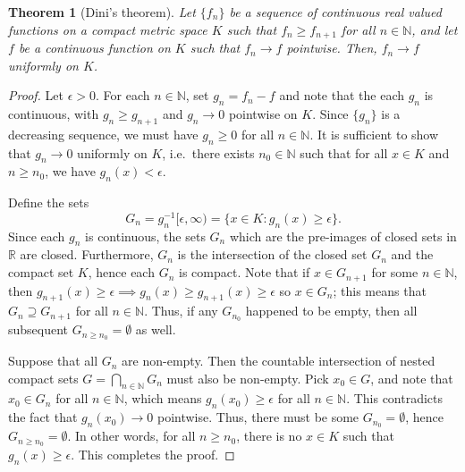 \documentclass[11pt]{article}
\def\R{\mathbb{R}}
\def\N{\mathbb{N}}
\newtheorem{theorem}{Theorem}[section]
\theoremstyle{definition}
\theoremstyle{remark}
\begin{document}
    \begin{theorem}[Dini's theorem] \label{theo:dini}
        Let $\{f_n\}$ be a sequence of continuous real valued functions on a compact
        metric space $K$ such that $f_n \geq f_{n + 1}$ for all $n \in \N$, and let
        $f$ be a continuous function on $K$ such that $f_n \to f$ pointwise. Then,
        $f_n \to f$ uniformly on $K$.
    \end{theorem}
    \begin{proof}
        Let $\epsilon > 0$. For each $n \in \N$, set $g_n = f_n - f$ and note that
        the each $g_n$ is continuous, with $g_n \geq g_{n + 1}$ and $g_n \to 0$
        pointwise on $K$. Since $\{g_n\}$ is a decreasing sequence, we must have $g_n
        \geq 0$ for all $n \in \N$.  It is sufficient to show that $g_n \to 0$
        uniformly on $K$, i.e.\ there exists $n_0 \in \N$ such that for all $x \in K$
        and $n \geq n_0$, we have $g_n(x) < \epsilon$.

        Define the sets \[
            G_n = g_n^{-1}[\epsilon, \infty) = \{x \in K\colon g_n(x) \geq \epsilon\}.
        \] Since each $g_n$ is continuous, the sets $G_n$ which are the pre-images of
        closed sets in $\R$ are closed. Furthermore, $G_n$ is the intersection of the
        closed set $G_n$ and the compact set $K$, hence each $G_n$ is compact. Note
        that if $x \in G_{n + 1}$ for some $n \in \N$, then $g_{n + 1}(x) \geq
        \epsilon \implies g_n(x) \geq g_{n + 1}(x) \geq \epsilon$ so $x \in G_n$;
        this means that $G_n \supseteq G_{n + 1}$ for all $n \in \N$. Thus, if any
        $G_{n_0}$ happened to be empty, then all subsequent $G_{n \geq n_0} =
        \emptyset$ as well.

        Suppose that all $G_n$ are non-empty. Then the countable intersection of
        nested compact sets $G = \bigcap_{n \in \N} G_n$ must also be non-empty. Pick
        $x_0 \in G$, and note that $x_0 \in G_n$ for all $n \in \N$, which means
        $g_n(x_0) \geq \epsilon$ for all $n \in \N$. This contradicts the fact that
        $g_n(x_0) \to 0$ pointwise. Thus, there must be some $G_{n_0} = \emptyset$,
        hence $G_{n \geq n_0} = \emptyset$. In other words, for all $n \geq n_0$,
        there is no $x \in K$ such that $g_n(x) \geq \epsilon$. This completes the
        proof.
    \end{proof}
\end{document}
